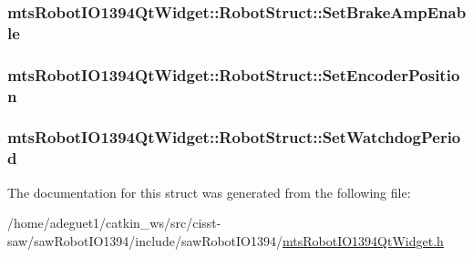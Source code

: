 \hypertarget{structmts_robot_i_o1394_qt_widget_1_1_robot_struct_ad417df4f69d6495b513bab95282c5d1c}{
\subsubsection[{Set\-Brake\-Amp\-Enable}]{ mts\-Robot\-I\-O1394\-Qt\-Widget\-::\-Robot\-Struct\-::\-Set\-Brake\-Amp\-Enable}}\label{structmts_robot_i_o1394_qt_widget_1_1_robot_struct_ad417df4f69d6495b513bab95282c5d1c}
\hypertarget{structmts_robot_i_o1394_qt_widget_1_1_robot_struct_a70dc86de257b6f14358323f985f07b8a}{
\subsubsection[{Set\-Encoder\-Position}]{ mts\-Robot\-I\-O1394\-Qt\-Widget\-::\-Robot\-Struct\-::\-Set\-Encoder\-Position}}\label{structmts_robot_i_o1394_qt_widget_1_1_robot_struct_a70dc86de257b6f14358323f985f07b8a}
\hypertarget{structmts_robot_i_o1394_qt_widget_1_1_robot_struct_a596d925a30141dfde20884ed7a778f42}{
\subsubsection[{Set\-Watchdog\-Period}]{ mts\-Robot\-I\-O1394\-Qt\-Widget\-::\-Robot\-Struct\-::\-Set\-Watchdog\-Period}}\label{structmts_robot_i_o1394_qt_widget_1_1_robot_struct_a596d925a30141dfde20884ed7a778f42}


The documentation for this struct was generated from the following file\-:\begin{DoxyCompactItemize}
\item 
/home/adeguet1/catkin\-\_\-ws/src/cisst-\/saw/saw\-Robot\-I\-O1394/include/saw\-Robot\-I\-O1394/\hyperlink{mts_robot_i_o1394_qt_widget_8h}{mts\-Robot\-I\-O1394\-Qt\-Widget.\-h}\end{DoxyCompactItemize}
